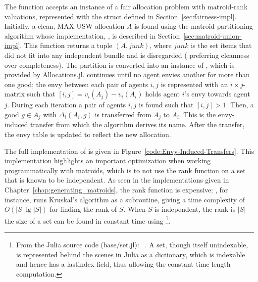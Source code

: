 The function accepts an instance of a fair allocation problem with matroid-rank valuations, represented with the  struct defined in Section~\ref{sec:fairness-impl}. Initially, a clean, MAX-USW allocation $A$ is found using the matroid partitioning algorithm whose implementation, , is described in Section~\ref{sec:matroid-union-impl}. This function returns a tuple $(A, junk)$, where $junk$ is the set items that did not fit into any independent bundle and is disregarded ( preferring cleanness over completeness). The partition is converted into an instance of , which is provided by Allocations.jl.  continues until no agent envies another for more than one good; the envy between each pair of agents $i,j$ is represented with an $i\times j$-matrix  such that $[i,j] = v_i(A_j) - v_i(A_i)$ holds agent $i$'s envy towards agent $j$. During each iteration a pair of agents $i,j$ is found such that $[i,j] > 1$. Then, a good $g\in A_j$ with $\Delta_i(A_i, g)$ is transferred from $A_j$ to $A_i$. This is the envy-induced transfer from which the algorithm derives its name. After the transfer, the envy table is updated to reflect the new allocation.

The full implementation of  is given in Figure~\ref{code:Envy-Induced-Transfers}. This implementation highlights an important optimization when working programmatically with matroids, which is to not use the rank function on a set that is known to be independent. As seen in the implementations given in Chapter~\ref{chap:generating_matroids}, the rank function is expensive; , for instance, runs Kruskal's algorithm as a subroutine, giving a time complexity of $O(|S|\lg{|S|})$ for finding the rank of $S$. When $S$ is independent, the rank is $|S|$---the size of a set can be found in constant time using \footnote{From the Julia source code (base/set.jl): ~\cite{bezanson2017julia}. A set, though itself unindexable, is represented behind the scenes in Julia as a dictionary, which is indexable and hence has a lastindex field, thus allowing the constant time length computation.}.

